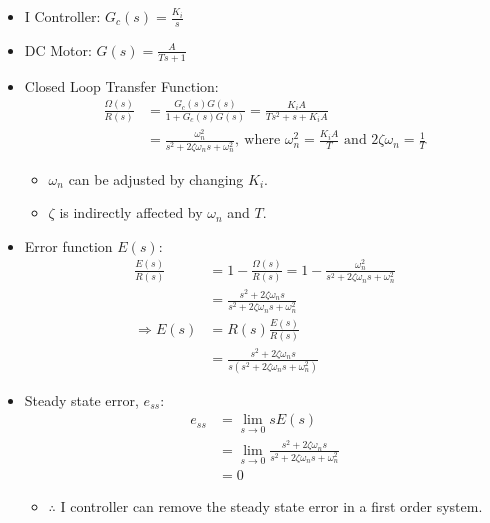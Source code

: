 \documentclass[a4paper]{article}
\begin{document}
\begin{center}
\end{center}

\begin{itemize}
    \item I Controller: $G_c(s) = \displaystyle\frac{K_i}{s}$
    \item DC Motor: $G(s) = \displaystyle\frac{A}{Ts+1}$
    \item Closed Loop Transfer Function:
    \begin{align*}
        \frac{\Omega(s)}{R(s)}&= \frac{G_c(s)G(s)}{1+G_c(s)G(s)} = \frac{K_iA}{Ts^2+s+K_iA}\\
        &= \frac{\omega_n^2}{s^2+2\zeta\omega_n s+\omega_n^2},\ \text{where }\omega_n^2 = \frac{K_iA}{T}\text{ and }2\zeta\omega_n = \frac{1}{T}
    \end{align*}
    \begin{itemize}[label=$\circ$]
        \item $\omega_n$ can be adjusted by changing $K_i$.
        \item $\zeta$ is indirectly affected by $\omega_n$ and $T$.
    \end{itemize}
    \item Error function $E(s)$:
    \begin{align*}
        \frac{E(s)}{R(s)} &= 1-\frac{\Omega(s)}{R(s)}=1-\frac{\omega_n^2}{s^2+2\zeta\omega_n s+\omega_n^2}\\
        &= \frac{s^2+2\zeta\omega_n s}{s^2+2\zeta\omega_n s+\omega_n^2}\\
        \Rightarrow E(s) &= R(s)\frac{E(s)}{R(s)}\\
        &= \frac{s^2+2\zeta\omega_n s}{s(s^2+2\zeta\omega_n s+\omega_n^2)}
    \end{align*}
    \item Steady state error, $e_{ss}$:
    \begin{align*}
        e_{ss} &= \lim_{s\to 0}sE(s)\\
        &= \lim_{s\to 0}\frac{s^2+2\zeta\omega_n s}{s^2+2\zeta\omega_n s+\omega_n^2}\\
        &= 0
    \end{align*}
    \begin{itemize}[label=$\circ$]
        \item $\therefore$ I controller can remove the steady state error in a first order system.
    \end{itemize}
\end{itemize}
\end{document}
